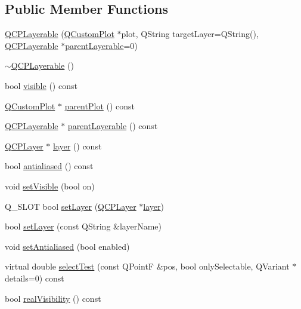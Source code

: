 \subsection*{Public Member Functions}
\begin{DoxyCompactItemize}
\item 
\hyperlink{classQCPLayerable_a74c0fa237f29bf0e49565013fc5d1ec0}{Q\+C\+P\+Layerable} (\hyperlink{classQCustomPlot}{Q\+Custom\+Plot} $\ast$plot, Q\+String target\+Layer=Q\+String(), \hyperlink{classQCPLayerable}{Q\+C\+P\+Layerable} $\ast$\hyperlink{classQCPLayerable_a98d79f5b716d45eac4347befe546d0ec}{parent\+Layerable}=0)
\item 
\hyperlink{classQCPLayerable_a4231cf5b3601d6d3a5781283e7a9735b}{$\sim$\+Q\+C\+P\+Layerable} ()
\item 
bool \hyperlink{classQCPLayerable_a10a3cc92e0fa63e4a929e61d34e275a7}{visible} () const 
\item 
\hyperlink{classQCustomPlot}{Q\+Custom\+Plot} $\ast$ \hyperlink{classQCPLayerable_ab7e0e94461566093d36ffc0f5312b109}{parent\+Plot} () const 
\item 
\hyperlink{classQCPLayerable}{Q\+C\+P\+Layerable} $\ast$ \hyperlink{classQCPLayerable_a98d79f5b716d45eac4347befe546d0ec}{parent\+Layerable} () const 
\item 
\hyperlink{classQCPLayer}{Q\+C\+P\+Layer} $\ast$ \hyperlink{classQCPLayerable_aea67e8c19145e70d68c286a36f6b8300}{layer} () const 
\item 
bool \hyperlink{classQCPLayerable_aef5cb4aa899ed9dc9384fd614560291e}{antialiased} () const 
\item 
void \hyperlink{classQCPLayerable_a3bed99ddc396b48ce3ebfdc0418744f8}{set\+Visible} (bool on)
\item 
Q\+\_\+\+S\+L\+OT bool \hyperlink{classQCPLayerable_ab0d0da6d2de45a118886d2c8e16d5a54}{set\+Layer} (\hyperlink{classQCPLayer}{Q\+C\+P\+Layer} $\ast$\hyperlink{classQCPLayerable_aea67e8c19145e70d68c286a36f6b8300}{layer})
\item 
bool \hyperlink{classQCPLayerable_ab25a0e7b897993b44447caee0f142083}{set\+Layer} (const Q\+String \&layer\+Name)
\item 
void \hyperlink{classQCPLayerable_a4fd43e89be4a553ead41652565ff0581}{set\+Antialiased} (bool enabled)
\item 
virtual double \hyperlink{classQCPLayerable_a4001c4d0dfec55598efa4d531f2179a9}{select\+Test} (const Q\+PointF \&pos, bool only\+Selectable, Q\+Variant $\ast$details=0) const 
\item 
bool \hyperlink{classQCPLayerable_a30809f7455e9794bca7b6c737622fa63}{real\+Visibility} () const 
\end{DoxyCompactItemize}
